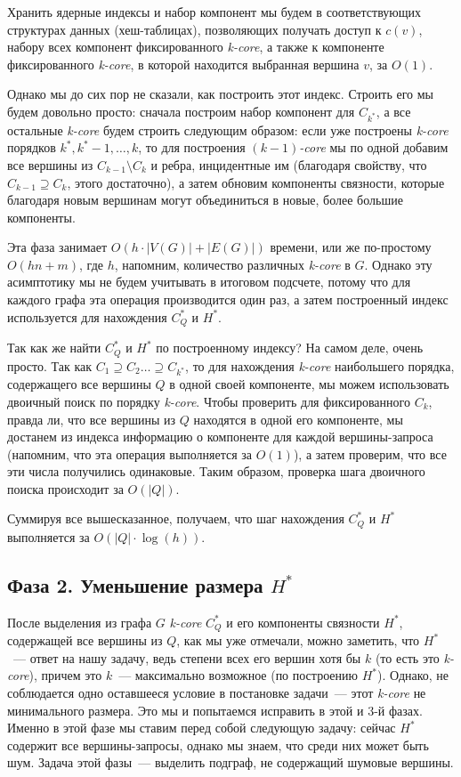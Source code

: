 Хранить ядерные индексы и набор компонент мы будем в соответствующих структурах данных (хеш-таблицах), позволяющих получать доступ к $c(v)$, набору всех компонент фиксированного \textit{k-core}, а также к компоненте фиксированного \textit{k-core}, в которой находится выбранная вершина $v$, за $O(1)$.

Однако мы до сих пор не сказали, как построить этот индекс. Строить его мы будем довольно просто: сначала построим набор компонент для $C_{k^*}$, а все остальные \textit{k-core} будем строить следующим образом: если уже построены \textit{k-core} порядков $k^*, k^*-1, \ldots, k$, то для построения \textit{$(k - 1)$-core} мы по одной добавим все вершины из $C_{k - 1} \setminus C_k$  и ребра, инцидентные им (благодаря свойству, что $C_{k - 1} \supseteq C_k$, этого достаточно), а затем обновим компоненты связности, которые благодаря новым вершинам могут объединиться в новые, более большие компоненты.

Эта фаза занимает $O(h \cdot |V(G)| + |E(G)|)$ времени, или же по-простому $O(hn + m)$, где $h$, напомним, количество различных \textit{k-core} в $G$. Однако эту асимптотику мы не будем учитывать в итоговом подсчете, потому что для каждого графа эта операция производится один раз, а затем построенный индекс используется для нахождения $C_Q^*$ и $H^*$.

Так как же найти $C_Q^*$ и $H^*$ по построенному индексу? На самом деле, очень просто. Так как $C_1 \supseteq C_2 \ldots \supseteq C_{k^*}$, то для нахождения \textit{k-core} наибольшего порядка, содержащего все вершины $Q$ в одной своей компоненте, мы можем использовать двоичный поиск по порядку \textit{k-core}. Чтобы проверить для фиксированного $C_k$, правда ли, что все вершины из $Q$ находятся в одной его компоненте, мы достанем из индекса информацию о компоненте для каждой вершины-запроса (напомним, что эта операция выполняется за $O(1)$), а затем проверим, что все эти числа получились одинаковые. Таким образом, проверка шага двоичного поиска происходит за $O(|Q|)$.

Суммируя все вышесказанное, получаем, что шаг нахождения $C_Q^*$ и $H^*$ выполняется за $O(|Q| \cdot \log(h))$.

\subsection{Фаза 2. Уменьшение размера $H^*$}

После выделения из графа $G$ \textit{k-core} $C_Q^*$ и его компоненты связности $H^*$, содержащей все вершины из $Q$, как мы уже отмечали, можно заметить, что $H^*$~--- ответ на нашу задачу, ведь степени всех его вершин хотя бы $k$ (то есть это \textit{k-core}), причем это $k$~--- максимально возможное (по построению $H^*$). Однако, не соблюдается одно оставшееся условие в постановке задачи~--- этот \textit{k-core} не минимального размера. Это мы и попытаемся исправить в этой и $3$-й фазах. Именно в этой фазе мы ставим перед собой следующую задачу: сейчас $H^*$ содержит все вершины-запросы, однако мы знаем, что среди них может быть шум. Задача этой фазы~--- выделить подграф, не содержащий шумовые вершины.

